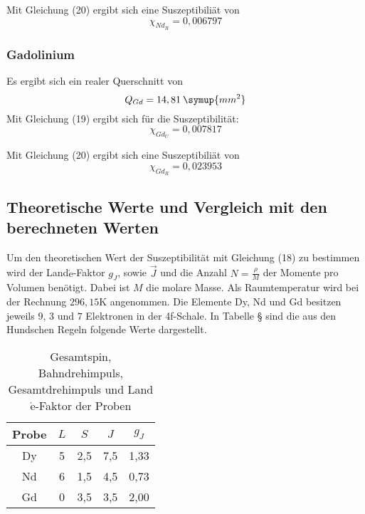 Mit Gleichung (20) ergibt sich eine Suszeptibiliät von
\begin{equation*}
  \chi_{Nd_R} = 0,006797
\end{equation*}

\subsubsection{Gadolinium}
Es ergibt sich ein realer Querschnitt von
\begin{equation*}
  Q_{Gd} = 14,81 \: \symup{mm^2}
\end{equation*}
Mit Gleichung (19) ergibt sich für die Suszeptibilität:
\begin{equation*}
  \chi_{Gd_U} = 0,007817
\end{equation*}

Mit Gleichung (20) ergibt sich eine Suszeptibiliät von
\begin{equation*}
  \chi_{Gd_R} = 0,023953
\end{equation*}


\subsection{Theoretische Werte und Vergleich mit den berechneten Werten}

Um den theoretischen Wert der Suszeptibilität mit Gleichung (18) zu bestimmen wird der Land$\acute{\text{e}}$-Faktor $g_J$, sowie $\vec{J}$ und
die Anzahl $N= \frac{\rho}{M}$ der Momente pro Volumen benötigt. Dabei ist $M$ die molare Masse. Als Raumtemperatur wird bei der
Rechnung $296,15$K angenommen. Die Elemente Dy, Nd und Gd besitzen jeweils $9$, $3$ und $7$ Elektronen in der 4f-Schale. In Tabelle §
sind die aus den Hundschen Regeln folgende Werte dargestellt.

\begin{table}[H]
  \centering
  \caption{Gesamtspin, Bahndrehimpuls, Gesamtdrehimpuls und Land$\acute{\text{e}}$-Faktor der Proben}
  \label{tab:Dy}
  \begin{tabular}{c c c c c}
    \toprule
    Probe & $L$ & $S$ & $J$  & $g_J$  \\
    \midrule
    Dy & 5 & 2,5 & 7,5 & 1,33\\
    Nd & 6 & 1,5 & 4,5 & 0,73\\
    Gd & 0 & 3,5 & 3,5 & 2,00\\
    \bottomrule
  \end{tabular}
\end{table}

